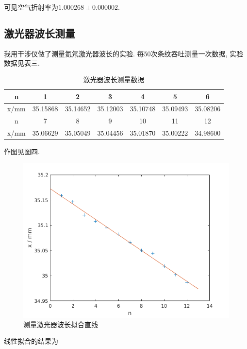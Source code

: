 \documentclass[a4paper,10pt,notitlepage]{article}
\begin{document}
	可见空气折射率为$1.000268 \pm 0.000002$.
	
\subsection{激光器波长测量}

	我用干涉仪做了测量氦氖激光器波长的实验. 每50次条纹吞吐测量一次数据, 实验数据见表三.
	
\begin{center}

	\begin{longtable}{|c|c|c|c|c|c|c|}
	\caption{激光器波长测量数据} \\
	\hline
	n & 1 & 2 & 3 & 4 & 5 & 6 \\
	\hline
	x/mm & 35.15868 & 35.14652 & 35.12003 & 35.10748 & 35.09493 & 35.08206 \\
	\hline
	\hline
	n & 7 & 8 & 9 & 10 & 11 & 12 \\
	\hline
	x/mm & 35.06629 & 35.05049 & 35.04456 & 35.01870 & 35.00222 & 34.98600 \\
	\hline
	\end{longtable}

\end{center}

	作图见图四. \\
	
\begin{figure}
\centering
	\includegraphics[scale=0.8]{f4.png}
	\caption{测量激光器波长拟合直线}
\end{figure}

	线性拟合的结果为 \\
	
\end{document}
